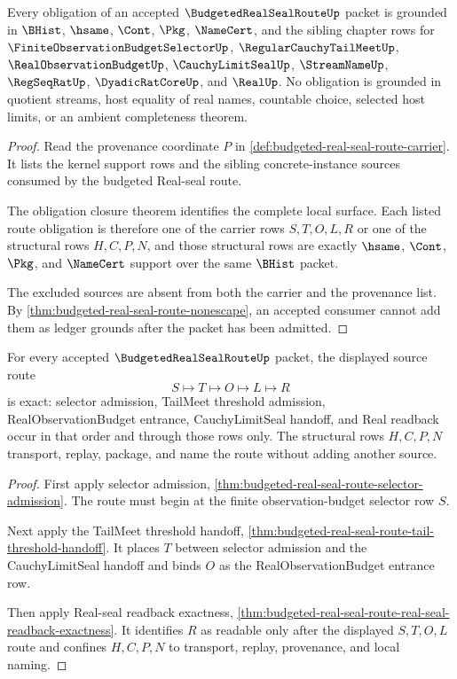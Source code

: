 \begin{theorem}
\label{thm:budgeted-real-seal-route-ledger-scope}
Every obligation of an accepted $\BudgetedRealSealRouteUp$ packet is grounded in $\BHist$, $\hsame$, $\Cont$, $\Pkg$, $\NameCert$, and the sibling chapter rows for $\FiniteObservationBudgetSelectorUp$, $\RegularCauchyTailMeetUp$, $\RealObservationBudgetUp$, $\CauchyLimitSealUp$, $\StreamNameUp$, $\RegSeqRatUp$, $\DyadicRatCoreUp$, and $\RealUp$. No obligation is grounded in quotient streams, host equality of real names, countable choice, selected host limits, or an ambient completeness theorem.
\end{theorem}
\begin{proof}
Read the provenance coordinate $P$ in \autoref{def:budgeted-real-seal-route-carrier}. It lists the kernel support rows and the sibling concrete-instance sources consumed by the budgeted Real-seal route.

The obligation closure theorem identifies the complete local surface. Each listed route obligation is therefore one of the carrier rows $S,T,O,L,R$ or one of the structural rows $H,C,P,N$, and those structural rows are exactly $\hsame$, $\Cont$, $\Pkg$, and $\NameCert$ support over the same $\BHist$ packet.

The excluded sources are absent from both the carrier and the provenance list. By \autoref{thm:budgeted-real-seal-route-nonescape}, an accepted consumer cannot add them as ledger grounds after the packet has been admitted.
\end{proof}

\begin{theorem}
\label{thm:budgeted-real-seal-route-source-exactness}
For every accepted $\BudgetedRealSealRouteUp$ packet, the displayed source route
$$
S \longmapsto T \longmapsto O \longmapsto L \longmapsto R
$$
is exact: selector admission, TailMeet threshold admission, RealObservationBudget entrance, CauchyLimitSeal handoff, and Real readback occur in that order and through those rows only. The structural rows $H,C,P,N$ transport, replay, package, and name the route without adding another source.
\end{theorem}
\begin{proof}
First apply selector admission, \autoref{thm:budgeted-real-seal-route-selector-admission}. The route must begin at the finite observation-budget selector row $S$.

Next apply the TailMeet threshold handoff, \autoref{thm:budgeted-real-seal-route-tail-threshold-handoff}. It places $T$ between selector admission and the CauchyLimitSeal handoff and binds $O$ as the RealObservationBudget entrance row.

Then apply Real-seal readback exactness, \autoref{thm:budgeted-real-seal-route-real-seal-readback-exactness}. It identifies $R$ as readable only after the displayed $S,T,O,L$ route and confines $H,C,P,N$ to transport, replay, provenance, and local naming.
\end{proof}

